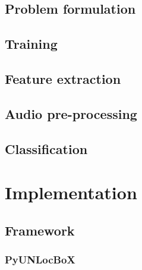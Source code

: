 \documentclass[a4paper,12pt,twoside]{report}
\begin{document}
\section{Problem formulation}

\section{Training}

\section{Feature extraction}

\section{Audio pre-processing}

\section{Classification}

\chapter{Implementation}

\section{Framework}

\subsection{PyUNLocBoX}
\end{document}
